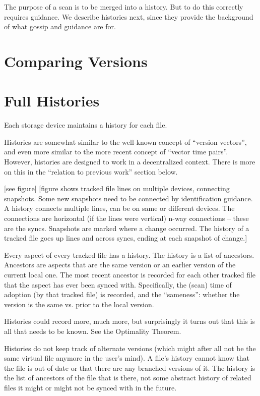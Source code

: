 \documentclass{book}
\begin{document}
The purpose of a scan is to be merged into a history.  But to do this correctly requires guidance.  We describe histories next, since they provide the background of what gossip and guidance are for.



\section*{Comparing Versions}



\section{Full Histories}

Each storage device maintains a history for each file.

Histories are somewhat similar to the well-known concept of ``version vectors'', and even more similar to the more recent concept of ``vector time pairs''.  However, histories are designed to work in a decentralized context.  There is more on this in the ``relation to previous work'' section below.

[see figure]
[figure shows tracked file lines on multiple devices, connecting snapshots.  Some new snapshots need to be connected by identification guidance.  A history connects multiple lines, can be on same or different devices.  The connections are horizontal (if the lines were vertical) n-way connections -- these are the syncs.  Snapshots are marked where a change occurred.  The history of a tracked file goes up lines and across syncs, ending at each snapshot of change.]

Every aspect of every tracked file has a history.  The history is a list of ancestors.  Ancestors are aspects that are the same version or an earlier version of the current local one.  The most recent ancestor is recorded for each other tracked file that the aspect has ever been synced with.  Specifically, the (scan) time of adoption (by that tracked file) is recorded, and the ``sameness'': whether the version is the same vs. prior to the local version.

Histories could record more, much more, but surprisingly it turns out that this is all that needs to be known.  See the Optimality Theorem.

Histories do not keep track of alternate versions (which might after all not be the same virtual file anymore in the user's mind).  A file's history cannot know that the file is out of date or that there are any branched versions of it.  The history is the list of ancestors of the file that is there, not some abstract history of related files it might or might not be synced with in the future.
\end{document}
